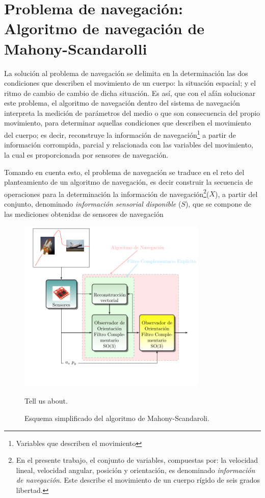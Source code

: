 \documentclass[conference]{IEEEtran}
\begin{document}
\section{Problema de navegación: Algoritmo de navegación de Mahony-Scandarolli}
La solución al problema de navegación se delimita en la determinación las dos condiciones que describen el movimiento de un cuerpo: la situación espacial; y el ritmo de cambio de cambio de dicha situación. Es así, que con el afán solucionar este problema, el algoritmo de navegación dentro del sistema de navegación interpreta la medición de parámetros del medio o que son consecuencia del propio movimiento, para determinar aquellas condiciones que describen el movimiento del cuerpo; es decir, reconstruye la información de navegación\footnote{Variables que describen el movimiento} a partir de información corrompida, parcial y relacionada con las variables del movimiento, la cual es proporcionada por sensores de navegación.\par
Tomando en cuenta esto, el problema de navegación se traduce en el reto del planteamiento de un algoritmo de navegación, es decir construir la secuencia de operaciones para la determinación la información de navegación\footnote{En el presente trabajo, el conjunto de variables, compuestas por: la velocidad lineal, velocidad angular, posición y orientación, es denominado \emph{información de navegación}. Este describe el movimiento de un cuerpo rígido de seis grados libertad.}($X$), a partir del conjunto, denominado \emph{información sensorial disponible} ($S$), que se compone de las mediciones obtenidas de sensores de navegación\par
\begin{figure}
\begin{center}
\includegraphics[width=9cm,clip]{intro_fig4.pdf}
\caption{Esquema simplificado del algoritmo de Mahony-Scandaroli.}
\scriptsize{Tell us about.}
\label{solucionMS_fig1}
\end{center}
\end{figure}
\end{document}
